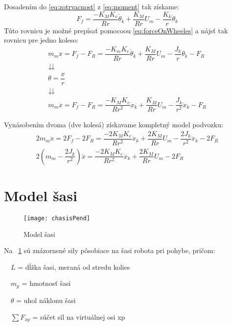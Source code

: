 Dosadením do \eqref{eq:zotrvacnost} z \eqref{eq:moment} tak získame:
\begin{equation}
F_f = \dfrac{-K_M K_e}{Rr}\dot{\theta}_k + \dfrac{K_M}{Rr}U_m - \dfrac{K_k}{r}\ddot{\theta}_k
\end{equation}
Túto rovnicu je možné prepísať pomocoou \eqref{eq:forceOnWheeles} a nájsť tak rovnicu pre jedno koleso:
\begin{equation}
\begin{gathered}
m_m \ddot{x} = F_f - F_R =  \dfrac{-K_m K_e}{Rr}\dot{\theta}_k + \dfrac{K_M}{Rr}U_m - \dfrac{J_k}{r}\ddot{\theta}_k - F_R \\
\downdownarrows
\\
\theta = \dfrac{x}{r}
\\
\downdownarrows
\\
m_m \ddot{x} = F_f - F_R = \dfrac{-K_M K_e}{R r^2}\dot{x}_k + \dfrac{K_M}{Rr}U_m - \dfrac{J_k}{r^2}\ddot{x}_k - F_R
\end{gathered}
\end{equation}

Vynásobením dvoma (dve kolesá) získavame kompletný model podvozku:
\begin{equation}
\begin{gathered}
2m_m \ddot{x} = 2F_f - 2F_R = \dfrac{-2K_M K_e}{R r^2}\dot{x}_k + \dfrac{2K_M}{Rr}U_m - \dfrac{2J_k}{r^2}\ddot{x}_k - 2F_R
\\
2(m_m - \dfrac{2J_k}{r^2}) \ddot{x} = \dfrac{-2K_M K_e}{R r^2}\dot{x}_k + \dfrac{2K_M}{Rr}U_m - 2F_R
\end{gathered}
\label{eq:wheels}
\end{equation}
\newpage
\section{Model šasi}


\begin{figure}[h!]
\centering
\texttt{[image: chasisPend]}
\caption{Model šasi}
\label{fig:chasisPend}
\end{figure}

Na \figurename~\ref{fig:chasisPend} sú znázornené sily pôsobiace na šasi robota pri pohybe, pričom:

$\quad L$ = dĺžka šasi, meraná od stredu kolies

$\quad m_p$ = hmotnosť šasi

$\quad \theta$ = uhol náklonu šasi

$\quad \sum{F_{xp}}$ = súčet síl na virtuálnej osi xp

